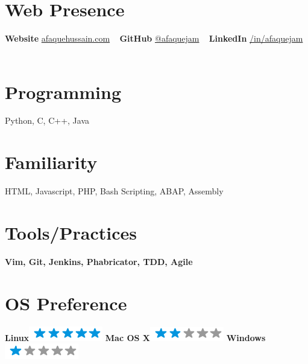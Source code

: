 \documentclass[]{friggeri-cv}
\begin{document}
\begin{aside}
  \section{Web Presence}
    \textbf{Website}
        \href{http://www.afaquehussain.com}{afaquehussain.com}
    ~
    \textbf{GitHub}
        \href{https://github.com/afaquejam}{@afaquejam}
    ~
    \textbf{LinkedIn}
        \href{http://www.linkedin.com/in/afaquejam}{/in/afaquejam}
    ~
  \section{Programming}
    Python, C, C++, Java
    ~
  \section{Familiarity}
    HTML, Javascript,
    PHP, Bash Scripting, ABAP, Assembly
    ~
   \section{Tools/Practices}
     \textbf{Vim, Git, Jenkins, Phabricator, TDD, Agile}
   ~
  \section{OS Preference}
    \textbf{Linux}\includegraphics[scale=0.40]{img/5stars.png}
    \textbf{Mac OS X}\includegraphics[scale=0.40]{img/2stars.png}
    \textbf{Windows}\includegraphics[scale=0.40]{img/1stars.png}
    ~
\end{aside}
\end{document}
